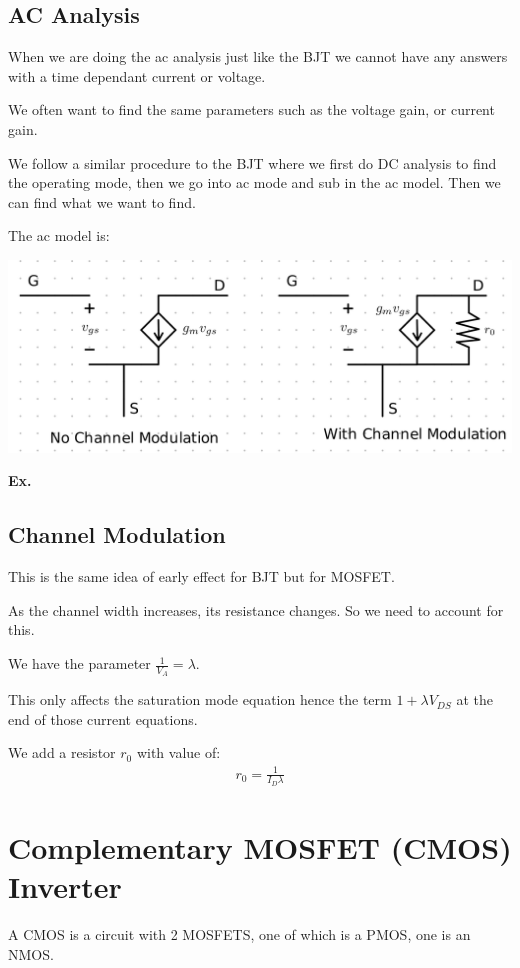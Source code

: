\documentclass[12pt,letterpaper]{article} \usepackage{amsmath} \usepackage{graphicx} \usepackage[margin=1in]{geometry} \usepackage{longtable}  \usepackage{amssymb}
\begin{document}
	\subsection{AC Analysis}
	When we are doing the ac analysis just like the BJT we cannot have any answers with a time dependant current or voltage. 
	
	We often want to find the same parameters such as the voltage gain, or current gain. 
	
	We follow a similar procedure to the BJT where we first do DC analysis to find the operating mode, then we go into ac mode and sub in the ac model. Then we can find what we want to find. 
	
	The ac model is:
	\begin{center}
		\includegraphics[width=0.8\linewidth]{mosfet-ac-model}
	\end{center}

	\begin{mdframed}
		\textbf{Ex. }
	\end{mdframed}
	
	
	\subsection{Channel Modulation}
	This is the same idea of early effect for BJT but for MOSFET. 
	
	As the channel width increases, its resistance changes. So we need to account for this. 
	
	We have the parameter $\frac{1}{V_A} = \lambda$.
	
	This only affects the saturation mode equation hence the term $1+\lambda V_{DS}$ at the end of those current equations. 
	
	We add a resistor $r_0$ with value of:
	\begin{align*}
		r_0 = \frac{1}{I_D \lambda}
	\end{align*}
	
	\section{Complementary MOSFET (CMOS) Inverter}
	A CMOS is a circuit with 2 MOSFETS, one of which is a PMOS, one is an NMOS. 
	
\end{document}
